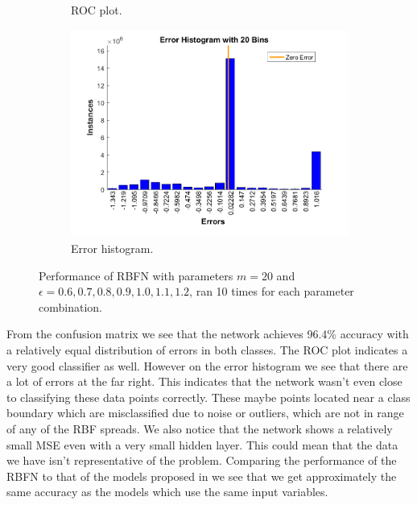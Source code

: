 \documentclass[a4paper, 11pt]{article}
\begin{document}
\begin{figure}[h!]
\begin{subfigure}[t]{0.32\textwidth}
        \caption{ROC plot.}
        \label{fig:roc}
    \end{subfigure}
    \hfill %
    \begin{subfigure}[t]{0.32\textwidth}
        \includegraphics[width=\textwidth]{../figures/final/errhist.png}
        \caption{Error histogram.}
        \label{fig:errhist}
    \end{subfigure}
    \caption{Performance of RBFN with parameters $m = 20$ and $\epsilon = 0.6,0.7, 0.8, 0.9, 1.0, 1.1, 1.2$, ran 10  times for each parameter combination.}\label{fig:accuracy}
\end{figure}

From the confusion matrix we see that the network achieves 96.4\% accuracy with a relatively equal distribution of errors in both classes. The ROC plot indicates a very good classifier as well. However on the error histogram we see that there are a lot of errors at the far right. This indicates that the network wasn't even close to classifying these data points correctly. These maybe points located near a class boundary which are misclassified due to noise or outliers, which are not in range of any of the RBF spreads. We also notice that the network shows a relatively small MSE even with a very small hidden layer. This could mean that the data we have isn't representative of the problem. Comparing the performance of the RBFN to that of the models proposed in \cite{Candanedo2016} we see that we get approximately the same accuracy as the models which use the same input variables.
\end{document}
